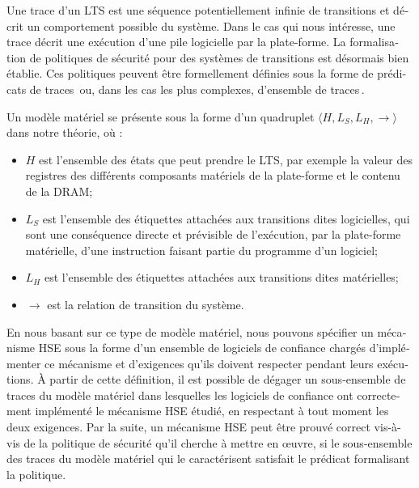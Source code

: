 \begin{otherlanguage}{french}
  Une trace d’un LTS est une séquence potentiellement infinie de transitions et
  décrit un comportement possible du système. Dans le cas qui nous intéresse,
  une trace décrit une exécution d’une pile logicielle par la plate-forme.
  La formalisation de politiques de sécurité pour des systèmes de transitions
  est désormais bien établie.
  Ces politiques peuvent être formellement définies sous la forme de prédicats
  de
  traces\,\cite{lamport1977proving,lamport1985logical,lamport1985logical,alpern1985liveness}
  ou, dans les cas les plus complexes, d’ensemble de
  traces\,\cite{clarkson2010hyperproperties}.

  Un modèle matériel se présente sous la forme d’un quadruplet
  \( \langle H, L_S, L_H, \rightarrow \rangle \) dans notre théorie, où :
  \begin{itemize}
  \item \( H \) est l’ensemble des états que peut prendre le LTS, par exemple la
    valeur des registres des différents composants matériels de la plate-forme
    et le contenu de la DRAM;
  \item \( L_S \) est l’ensemble des étiquettes attachées aux transitions dites
    logicielles, qui sont une conséquence directe et prévisible de l’exécution,
    par la plate-forme matérielle, d’une instruction faisant partie du programme
    d’un logiciel;
  \item \( L_H \) est l’ensemble des étiquettes attachées aux transitions dites
    matérielles;
  \item \( \rightarrow \) est la relation de transition du système.
  \end{itemize}

  En nous basant sur ce type de modèle matériel, nous pouvons spécifier un
  mécanisme HSE sous la forme d’un ensemble de logiciels de confiance chargés
  d’implémenter ce mécanisme et d’exigences qu’ils doivent respecter pendant
  leurs exécutions.
  À partir de cette définition, il est possible de dégager un sous-ensemble de
  traces du modèle matériel dans lesquelles les logiciels de confiance ont
  correctement implémenté le mécanisme HSE étudié, en respectant à tout moment
  les deux exigences.
  Par la suite, un mécanisme HSE peut être prouvé correct vis-à-vis de la
  politique de sécurité qu’il cherche à mettre en œuvre, si le sous-ensemble des
  traces du modèle matériel qui le caractérisent satisfait le prédicat
  formalisant la politique.


\end{otherlanguage}
